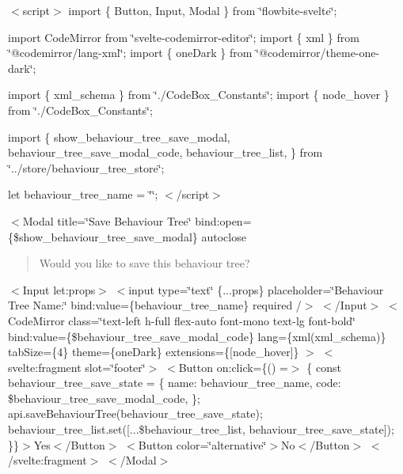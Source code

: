 $<$script$>$ import \{ Button, Input, Modal \} from \char`\"{}flowbite-\/svelte\char`\"{};

import Code\+Mirror from \char`\"{}svelte-\/codemirror-\/editor\char`\"{}; import \{ xml \} from \char`\"{}@codemirror/lang-\/xml\char`\"{}; import \{ one\+Dark \} from \char`\"{}@codemirror/theme-\/one-\/dark\char`\"{};

import \{ xml\+\_\+schema \} from \char`\"{}./\+Code\+Box\+\_\+\+Constants\char`\"{}; import \{ node\+\_\+hover \} from \char`\"{}./\+Code\+Box\+\_\+\+Constants\char`\"{};

import \{ show\+\_\+behaviour\+\_\+tree\+\_\+save\+\_\+modal, behaviour\+\_\+tree\+\_\+save\+\_\+modal\+\_\+code, behaviour\+\_\+tree\+\_\+list, \} from \char`\"{}../store/behaviour\+\_\+tree\+\_\+store\char`\"{};

let behaviour\+\_\+tree\+\_\+name = \char`\"{}\char`\"{}; $<$/script$>$

\texorpdfstring{$<$}{<}Modal title=\char`\"{}\+Save Behaviour Tree\char`\"{} bind\+:open=\{\$show\+\_\+behaviour\+\_\+tree\+\_\+save\+\_\+modal\} autoclose \begin{quote}
 

Would you like to save this behaviour tree? 

\end{quote}
$<$\+Input let\+:props$>$ \texorpdfstring{$<$}{<}input type=\char`\"{}text\char`\"{} \{...props\} placeholder=\char`\"{}\+Behaviour Tree Name\+:\char`\"{} bind\+:value=\{behaviour\+\_\+tree\+\_\+name\} required /\texorpdfstring{$>$}{>} $<$/\+Input$>$ $<$\+Code\+Mirror         class=\char`\"{}text-\/left h-\/full flex-\/auto font-\/mono text-\/lg font-\/bold\char`\"{}         bind\+:value=\{\$behaviour\+\_\+tree\+\_\+save\+\_\+modal\+\_\+code\}         lang=\{xml(xml\+\_\+schema)\}         tab\+Size=\{4\}         theme=\{one\+Dark\}         extensions=\{\mbox{[}node\+\_\+hover\mbox{]}\}     $>$ \texorpdfstring{$<$}{<}svelte\+:fragment slot=\char`\"{}footer\char`\"{}\texorpdfstring{$>$}{>} \texorpdfstring{$<$}{<}Button on\+:click=\{() =\texorpdfstring{$>$}{>} \{ const behaviour\+\_\+tree\+\_\+save\+\_\+state = \{ name\+: behaviour\+\_\+tree\+\_\+name, code\+: \$behaviour\+\_\+tree\+\_\+save\+\_\+modal\+\_\+code, \}; api.\+save\+Behaviour\+Tree(behaviour\+\_\+tree\+\_\+save\+\_\+state); behaviour\+\_\+tree\+\_\+list.\+set(\mbox{[}...\$behaviour\+\_\+tree\+\_\+list, behaviour\+\_\+tree\+\_\+save\+\_\+state\mbox{]}); \}\}\texorpdfstring{$>$}{>}Yes$<$/\+Button$>$ $<$\+Button color=\char`\"{}alternative\char`\"{}$>$No$<$/\+Button$>$ \texorpdfstring{$<$}{<}/svelte\+:fragment\texorpdfstring{$>$}{>} $<$/\+Modal$>$ 